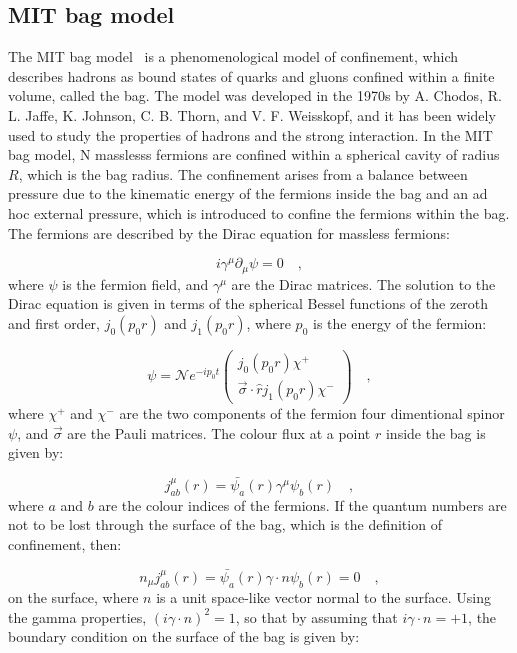 \subsection{MIT bag model}
The MIT bag model~\cite{Johnson:1975zp} is a phenomenological model of confinement, which describes hadrons as bound states of quarks and gluons confined within a finite volume, called the bag. The model was developed in the 1970s by A. Chodos, R. L. Jaffe, K. Johnson, C. B. Thorn, and V. F. Weisskopf, and it has been widely used to study the properties of hadrons and the strong interaction. In the MIT bag model, N masslesss fermions are confined within a spherical cavity of radius $R$, which is the bag radius. The confinement arises from a balance between pressure due to the kinematic energy of the fermions inside the bag and an ad hoc external pressure, which is introduced to confine the fermions within the bag. The fermions are described by the Dirac equation for massless fermions:

\begin{equation*}
    i\gamma^\mu\partial_\mu\psi = 0\quad ,
\end{equation*}
where $\psi$ is the fermion field, and $\gamma^\mu$ are the Dirac matrices. The solution to the Dirac equation is given in terms of the spherical Bessel functions of the zeroth and first order, $j_0(p_0r)$ and $j_1(p_0r)$, where $p_0$ is the energy of the fermion:

\begin{equation*}
    \psi = \mathcal{N} e^{-ip_0t} \begin{pmatrix} j_0(p_0r)\chi^+ \\ \vec{\sigma}\cdot\hat{r}j_1(p_0r)\chi^-\end{pmatrix}\quad ,
\end{equation*}
where $\chi^+$ and $\chi^-$ are the two components of the fermion four dimentional spinor $\psi$, and $\vec{\sigma}$ are the Pauli matrices. The colour flux at a point $r$ inside the bag is given by:

\begin{equation*}
    j_{ab}^\mu(r) = \bar{\psi_a}(r)\gamma^\mu\psi_b(r)\quad ,
\end{equation*}
where $a$ and $b$ are the colour indices of the fermions. If the quantum numbers are not to be lost through the surface of the bag, which is the definition of confinement, then:

\begin{equation*}
  n_\mu j_{ab}^\mu(r) = \bar{\psi_a}(r)\gamma\cdot n \psi_b(r) = 0\quad ,
\end{equation*}
on the surface, where $n$ is a unit space-like vector normal to the surface. Using the gamma properties, $(i\gamma\cdot n)^2 = 1$, so that by assuming that $i\gamma\cdot n = + 1$, the boundary condition on the surface of the bag is given by:

